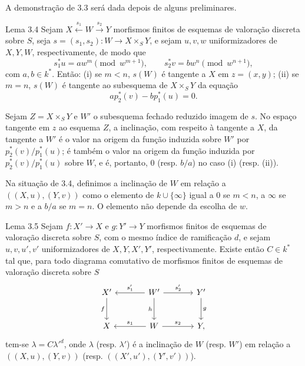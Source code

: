 A demonstração de 3.3 será dada depois de alguns preliminares.

\begin{statement}{Lema 3.4}
Sejam $X\xleftarrow{s_1}W\xrightarrow{s_2}Y$ morfismos finitos de esquemas de valoração discreta sobre $S$, seja $s=(s_1,s_2):W\to X\times_SY$, e sejam $u,v,w$ uniformizadores de $X,Y,W$, respectivamente, de modo que
\[
s_1^*u=aw^m\pmod {w^{m+1}},\qquad
s_2^*v=bw^n\pmod {w^{n+1}},
\]
com $a,b\in k^*$. Então: (i) se $m<n$, $s(W)$ é tangente a $X$ em $z=(x,y)$; (ii) se $m=n$, $s(W)$ é tangente ao subesquema de $X\times_SY$ da equação
\[
ap_2^*(v)-bp_1^*(u)=0.
\]
\end{statement}

Sejam $Z=X\times_SY$ e $W'$ o subesquema fechado reduzido imagem de $s$. No espaço tangente em $z$ ao esquema $Z$, a inclinação, com respeito à tangente a $X$, da tangente a $W'$ é o valor na origem da função induzida sobre $W'$ por $p_2^*(v)/p_1^*(u)$; é também o valor na origem da função induzida por $p_2^*(v)/p_1^*(u)$ sobre $W$, e é, portanto, $0$ (resp. $b/a$) no caso (i) (resp. (ii)).

Na situação de 3.4, definimos a inclinação de $W$ em relação a $((X,u),(Y,v))$ como o elemento de $k\cup\{\infty\}$ igual a $0$ se $m<n$, a $\infty$ se $m>n$ e a $b/a$ se $m=n$. O elemento não depende da escolha de $w$.

\begin{statement}{Lema 3.5}
Sejam $f:X'\to X$ e $g:Y'\to Y$ morfismos finitos de esquemas de valoração discreta sobre $S$, com o mesmo índice de ramificação $d$, e sejam $u,v,u',v'$ uniformizadores de $X,Y,X',Y'$, respectivamente. Existe então $C\in k^*$ tal que, para todo diagrama comutativo de morfismos finitos de esquemas de valoração discreta sobre $S$
\[
\begin{tikzcd}[column sep=large,row sep=large]
X' \arrow[d,"f"'] & W' \arrow[l,"s'_1"'] \arrow[r,"s'_2"] \arrow[d,"h"'] & Y' \arrow[d,"g"]\\
X & W \arrow[l,"s_1"'] \arrow[r,"s_2"] & Y ,
\end{tikzcd}
\]
tem-se $\lambda=C{\lambda'}^d$, onde $\lambda$ (resp. $\lambda'$) é a inclinação de $W$ (resp. $W'$) em relação a $((X,u),(Y,v))$ (resp. $((X',u'),(Y',v'))$).
\end{statement}


